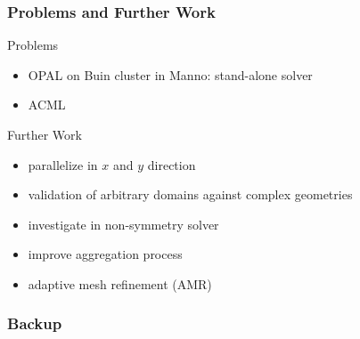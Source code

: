 \documentclass[xcolor=pdftex,table,10pt]{beamer}
\newcommand{\opal}{\textsc{OPAL }}
\begin{document}
	\begin{frame}
		\frametitle{Problems and Further Work}

		\begin{alertblock}{Problems}
		\begin{itemize}
			\item \opal on Buin cluster in Manno: stand-alone solver
			\item ACML
		\end{itemize}
		\end{alertblock}
		\pause

		\vspace{0.8cm}

		\begin{block}{Further Work}
		\begin{itemize}
			\item parallelize in $x$ and $y$ direction
			\item validation of arbitrary domains against complex geometries
			\item investigate in non-symmetry solver
			\item improve aggregation process
			\item adaptive mesh refinement (AMR)
		\end{itemize}
		\end{block}

	\end{frame}
 
	\begin{frame}
	  	\frametitle{Backup}
		\begin{center}
			\color{blue}{\LARGE{Backup}}
		\end{center}
	\end{frame}
\end{document}
